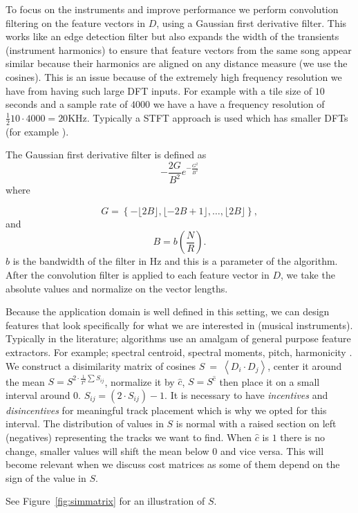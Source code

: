 \documentclass[twocolumn]{article}
\begin{document}
	To focus on the instruments and improve performance we perform convolution filtering on the feature vectors in $D$, using a Gaussian first derivative filter. This works like an edge detection filter but also expands the width of the transients (instrument harmonics) to ensure that feature vectors from the same song appear similar because their harmonics are aligned on any distance measure (we use the cosines). This is an issue because of the extremely high frequency resolution we have from having such large DFT inputs. For example with a tile size of $10$ seconds and a sample rate of $4000$ we have a have a frequency resolution of $\frac{1}{2}10 \cdot 4000 = 20$KHz. Typically a STFT approach is used which has smaller DFTs (for example \cite{tzanetakis1999multifeature}). 
	
	The Gaussian first derivative filter is defined as 
	$$- \frac{2 G}{B^2}  e^{-\frac{G^2}{B^2}} $$ where 
	
	$$G=\left\{-\lfloor 2B\rfloor,\lfloor-2B+1\rfloor,\ldots, \lfloor 2 B \rfloor\right\},$$ and $$B = b \left( \frac{N}{R} \right).$$ $b$ is the bandwidth of the filter in Hz and this is a parameter of the algorithm. After the convolution filter is applied to each feature vector in $D$, we take the absolute values and normalize on the vector lengths.  
	
	Because the application domain is well defined in this setting, we can design features that look specifically for what we are interested in (musical instruments). Typically in the literature; algorithms use an amalgam of general purpose feature extractors. For example; spectral centroid, spectral moments, pitch, harmonicity \cite{tzanetakis1999framework}. We construct a disimilarity matrix of cosines $S ~=~ \left< D_{i} \cdot D_{j} \right>$, center it around the mean $S = S^{2 \cdot \frac{1}{T^2}\sum S_{ij}}$, normalize it by $\hat c$, $S=S^{\hat c}$ then place it on a small interval around $0$. $S_{ij} = \left( 2 \cdot S_{ij} \right)-1$. It is necessary to have \textit{incentives} and \textit{disincentives} for meaningful track placement which is why we opted for this interval. The distribution of values in $S$ is normal with a raised section on left (negatives) representing the tracks we want to find. When $\hat c$ is $1$ there is no change, smaller values will shift the mean below $0$ and vice versa. This will become relevant when we discuss cost matrices as some of them depend on the sign of the value in $S$. 
	
	See Figure~\ref{fig:simmatrix} for an illustration of $S$.
	
\end{document}
